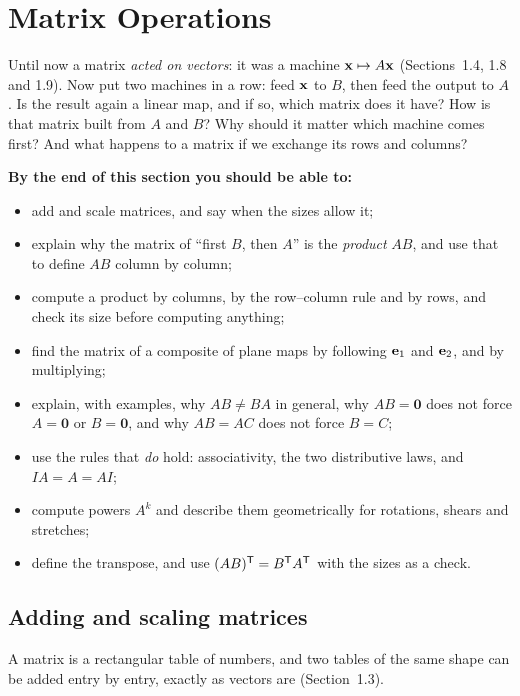 \documentclass[11pt]{article}
\begin{document}
\section{Matrix Operations}

\begin{guide}
Until now a matrix \emph{acted on vectors}: it was a machine $\mathbf{x}\mapsto A\mathbf{x}$ (Sections~1.4, 1.8 and 1.9). Now put two machines in a row: feed $\mathbf{x}$ to $B$, then feed the output to $A$. Is the result again a linear map, and if so, which matrix does it have? How is that matrix built from $A$ and $B$? Why should it matter which machine comes first? And what happens to a matrix if we exchange its rows and columns?
\end{guide}

\textbf{By the end of this section you should be able to:}
\begin{itemize}
  \item add and scale matrices, and say when the sizes allow it;
  \item explain why the matrix of ``first $B$, then $A$'' is the \emph{product} $AB$, and use that to define $AB$ column by column;
  \item compute a product by columns, by the row--column rule and by rows, and check its size before computing anything;
  \item find the matrix of a composite of plane maps by following $\mathbf{e}_1$ and $\mathbf{e}_2$, and by multiplying;
  \item explain, with examples, why $AB\neq BA$ in general, why $AB=\mathbf{0}$ does not force $A=\mathbf{0}$ or $B=\mathbf{0}$, and why $AB=AC$ does not force $B=C$;
  \item use the rules that \emph{do} hold: associativity, the two distributive laws, and $I A=A=AI$;
  \item compute powers $A^k$ and describe them geometrically for rotations, shears and stretches;
  \item define the transpose, and use $(AB)^{\mathsf T}=B^{\mathsf T} A^{\mathsf T}$ with the sizes as a check.
\end{itemize}

\subsection*{Adding and scaling matrices}

A matrix is a rectangular table of numbers, and two tables of the same shape can be added entry by entry, exactly as vectors are (Section~1.3).
\end{document}
